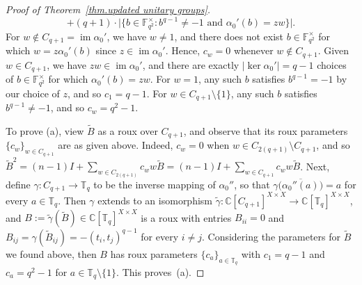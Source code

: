 \begin{proof}[Proof of Theorem~\ref{thm.updated unitary groups}]
\[+(q+1)\cdot \Big|\Big\{b\in\mathbb{F}_{q^2}^\times:b^{q-1}\neq-1\text{ and }\alpha_0'(b)=zw\Big\}\Big|.
\]
For $w\not\in C_{q+1}=\operatorname{im}\alpha_0'$, we have $w\neq 1$, and there does not exist $b\in\mathbb{F}_{q^2}^\times$ for which $w=z\alpha_0'(b)$ since $z\in\operatorname{im}\alpha_0'$.
Hence, $c_w=0$ whenever $w\not\in C_{q+1}$.
Given $w\in C_{q+1}$, we have $zw\in\operatorname{im}\alpha_0'$, and there are exactly $|\operatorname{ker}\alpha_0'|=q-1$ choices of $b\in\mathbb{F}_{q^2}^\times$ for which $\alpha_0'(b)=zw$.
For $w=1$, any such $b$ satisfies $b^{q-1} = -1$ by our choice of $z$, and so
$c_1 = q-1$.
For $w \in C_{q+1} \setminus \{1\}$, any such $b$ satisfies $b^{q-1}\neq-1$, and so $c_w =q^2-1$.

To prove (a), view $\tilde{B}$ as a roux over $C_{q+1}$, and observe that its roux parameters~$\{c_w\}_{w\in C_{q+1}}$ are as given above.
Indeed, $c_w = 0$ when $w \in C_{2(q+1)}\setminus C_{q+1}$, and so $\tilde{B}^2 = (n-1) I + \sum_{w\in C_{2(q+1)}} c_w w \tilde{B} = (n-1) I + \sum_{w\in C_{q+1}} c_w w \tilde{B}$.
Next, define $\gamma \colon C_{q+1} \to \mathbb{T}_q$ to be the inverse mapping of $\alpha_0''$, so that $\gamma\bigl( \overline{\alpha_0''(a)} \bigr) = a$ for every $a \in \mathbb{T}_q$.
Then $\gamma$ extends to an isomorphism $\tilde{\gamma} \colon \mathbb{C}[C_{q+1}]^{X \times X} \to \mathbb{C}[\mathbb{T}_q]^{X\times X}$, and $B:= \tilde{\gamma}(\tilde{B}) \in \mathbb{C}[\mathbb{T}_q]^{X\times X}$ is a roux with entries $B_{ii} = 0$ and $B_{ij} = \gamma( \tilde{B}_{ij} ) = - (t_i,t_j)^{q-1}$ for every $i \neq j$.
Considering the parameters for $\tilde{B}$ we found above, then $B$ has roux parameters $\{ c_a \}_{a\in \mathbb{T}_q}$ with $c_1 = q-1$ and $c_a = q^2 - 1$ for $a \in \mathbb{T}_q \setminus \{1\}$.
This proves~(a).


\end{proof}
